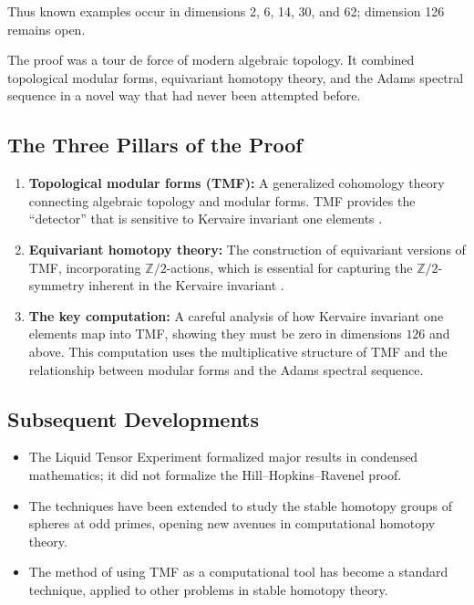 Thus known examples occur in dimensions 2, 6, 14, 30, and 62; dimension 126 remains open.

\begin{highlightbox}
The proof was a tour de force of modern algebraic topology. It combined topological modular forms, equivariant homotopy theory, and the Adams spectral sequence in a novel way that had never been attempted before.
\end{highlightbox}

\subsection{The Three Pillars of the Proof}

\begin{enumerate}
\item \textbf{Topological modular forms (TMF):} A generalized cohomology theory connecting algebraic topology and modular forms. TMF provides the ``detector'' that is sensitive to Kervaire invariant one elements \cite{hopkins2004}.

\item \textbf{Equivariant homotopy theory:} The construction of equivariant versions of TMF, incorporating $\mathbb{Z}/2$-actions, which is essential for capturing the $\mathbb{Z}/2$-symmetry inherent in the Kervaire invariant \cite{hill2010}.

\item \textbf{The key computation:} A careful analysis of how Kervaire invariant one elements map into TMF, showing they must be zero in dimensions $126$ and above. This computation uses the multiplicative structure of TMF and the relationship between modular forms and the Adams spectral sequence.
\end{enumerate}

\subsection{Subsequent Developments}

\begin{itemize}
\item The Liquid Tensor Experiment formalized major results in condensed mathematics; it did not formalize the Hill--Hopkins--Ravenel proof.
\item The techniques have been extended to study the stable homotopy groups of spheres at odd primes, opening new avenues in computational homotopy theory.
\item The method of using TMF as a computational tool has become a standard technique, applied to other problems in stable homotopy theory.
\end{itemize}

